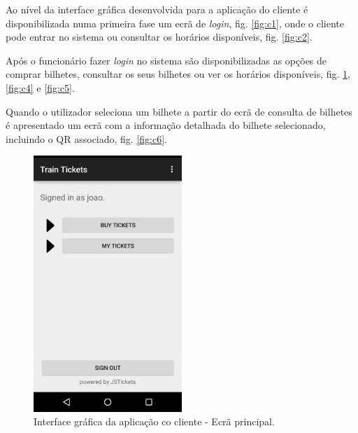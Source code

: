\documentclass[12pt]{article}
\begin{document}
Ao nível da interface gráfica desenvolvida para a aplicação do cliente é disponibilizada numa primeira fase um ecrã de \textit{login}, fig. \ref{fig:c1}, onde o cliente pode entrar no sistema ou consultar os horários disponíveis, fig. \ref{fig:c2}.

Após o funcionário fazer \textit{login} no sistema são disponibilizadas as opções de comprar bilhetes, consultar os seus bilhetes ou ver os horários disponíveis, fig. \ref{fig:c3}, \ref{fig:c4} e \ref{fig:c5}.

Quando o utilizador seleciona um bilhete a partir do ecrã de consulta de bilhetes é apresentado um ecrã com a informação detalhada do bilhete selecionado, incluindo o QR associado, fig. \ref{fig:c6}.

\begin{figure}[H]
    \centering
    \includegraphics[width=0.5\textwidth]{Screenshot_Main.png}
    \caption{Interface gráfica da aplicação co cliente - Ecrã principal.}
    \label{fig:c3}
\end{figure}
\end{document}
